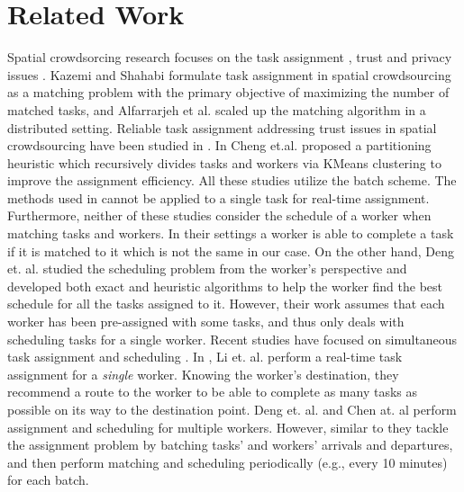 \section{Related Work}
\label{sec:related}

Spatial crowdsorcing research focuses on the task assignment \cite{Kazemi12,Alfarrarjeh15,Cheng15,Deng13,Li15,Chen15,Deng15}, trust \cite{Kazemi13,Cheng15} and privacy issues \cite{To14}. Kazemi and Shahabi \cite{Kazemi12} formulate task assignment in spatial crowdsourcing as a matching problem with the primary objective of maximizing the number of matched tasks, and Alfarrarjeh et al. \cite{Alfarrarjeh15} scaled up the matching algorithm in a distributed setting. Reliable task assignment addressing trust issues in spatial crowdsourcing have been studied in \cite{Kazemi13,Cheng15}. In \cite{Cheng15} Cheng et.al. proposed a partitioning heuristic which recursively divides tasks and workers via KMeans clustering to improve the assignment efficiency. All these studies utilize the batch scheme. The methods used in \cite{Kazemi12,Cheng15,Alfarrarjeh15} cannot be applied to a single task for real-time assignment. Furthermore, neither of these studies consider the schedule of a worker when matching tasks and workers. In their settings a worker is able to complete a task if it is matched to it which is not the same in our case. On the other hand, Deng et. al. \cite{Deng13} studied the scheduling problem from the worker's perspective and developed both exact and heuristic algorithms to help the worker find the best schedule for all the tasks assigned to it. However, their work assumes that each worker has been pre-assigned with some tasks, and thus only deals with scheduling tasks for a single worker. Recent studies have focused on simultaneous task assignment and scheduling \cite{Li15,Deng15,Cheng15}. In \cite{Li15}, Li et. al. perform a real-time task assignment for a \emph{single} worker. Knowing the worker's destination, they recommend a route to the worker to be able to complete as many tasks as possible on its way to the destination point. Deng et. al. \cite{Deng15} and Chen at. al \cite{Chen15} perform assignment and scheduling for multiple workers. However, similar to \cite{Kazemi12,Cheng15,Alfarrarjeh15} they tackle the assignment problem by batching tasks' and workers' arrivals and departures, and then perform matching and scheduling periodically (e.g., every 10 minutes) for each batch.

